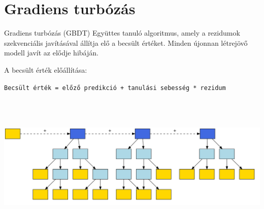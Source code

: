 \documentclass[english, aspectratio=169]{beamer}
\makeatletter
\let\origtableofcontents=\tableofcontents
\def\tableofcontents{\@ifnextchar[{\origtableofcontents}{\gobbletableofcontents}}
\def\gobbletableofcontents#1{\origtableofcontents}
\makeatother
\begin{document}
\section{Gradiens turbózás}

\begin{frame}
\tableofcontents[currentsection]
\end{frame}

\begin{frame}{Gradiens turbózás (GBDT)}
Együttes tanuló algoritmus, amely a rezidumok szekvenciális javításával állítja elő a becsült értéket. Minden újonnan létrejövő modell javít az elődje hibáján.\par\medskip
A becsült érték előállítása:\par
\begin{block}{}
\begin{center}
\texttt{Becsült érték = előző predikció + tanulási sebesség * rezidum}
\end{center}
\end{block}
\begin{center}
\includegraphics[width=14cm, height=7cm, keepaspectratio]{graphs/ensemble_4.png}
\end{center}
\end{frame}
\end{document}
